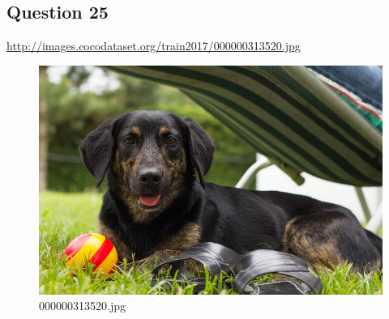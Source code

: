\subsection*{Question 25}
\url{http://images.cocodataset.org/train2017/000000313520.jpg}
    \begin{figure}[h]
        \centering
        \includegraphics[width=0.8\linewidth]{../image set/easy/000000313520.jpg}
        \caption{000000313520.jpg}
    \end{figure}
